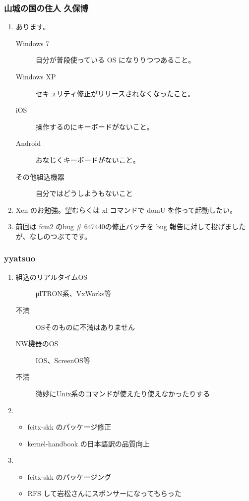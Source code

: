 \documentclass[cjk,dvipdfmx,10pt,compress,%
hyperref={bookmarks=true,bookmarksnumbered=true,bookmarksopen=false,%
colorlinks=false,%
pdftitle={第 82 回 関西 Debian 勉強会},%
pdfauthor={倉敷・のがた・佐々木・かわだ・八津尾},%
pdfsubject={資料},%
}]{beamer}
\begin{document}
\begin{frame}
  \frametitle{ 山城の国の住人 久保博 }
  \begin{enumerate}
  \item あります。
    \begin{description}
    \item[Windows 7] 自分が普段使っている OS になりりつつあること。
    \item[Windows XP] セキュリティ修正がリリースされなくなったこと。
    \item[iOS] 操作するのにキーボードがないこと。
    \item[Android] おなじくキーボードがないこと。
    \item[その他組込機器] 自分ではどうしようもないこと
    \end{description}
  \item Xen のお勉強。望むらくは xl コマンドで domU を作って起動したい。
  \item 前回は fcm2 のbug \# 647440の修正バッチを bug 報告に対して投げましたが、なしのつぶてです。
  \end{enumerate}
\end{frame}

\begin{frame}
  \frametitle{ yyatsuo }
  \begin{enumerate}
  \item %
    \begin{description}
    \item[組込のリアルタイムOS] μITRON系、VxWorks等
    \item[不満] OSそのものに不満はありません
    \end{description}
    \begin{description}
    \item[NW機器のOS] IOS、ScreenOS等
    \item[不満] 微妙にUnix系のコマンドが使えたり使えなかったりする
    \end{description}
  \item %
    \begin{itemize}
    \item fcitx-skk のパッケージ修正
    \item kernel-handbook の日本語訳の品質向上
    \end{itemize}
  \item %
    \begin{itemize}
    \item fcitx-skk のパッケージング
    \item RFS して岩松さんにスポンサーになってもらった
    \end{itemize}
  \end{enumerate}
\end{frame}
\end{document}
